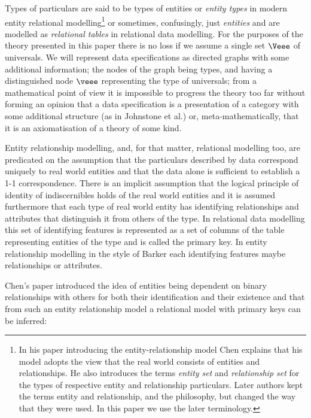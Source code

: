 Types of particulars are said to be 
types of entities or \textit{entity types} in modern entity relational modelling\footnote{In  his paper  introducing the entity-relationship model Chen explains that his model adopts the view that the real world consists of entities and relationships. He also introduces the  terms \textit{entity set} and \textit{relationship set} for the types of respective entity and relationship particulars. Later authors kept the terms entity and relationship, and the philosophy, but changed the way that they were used. In this paper we use the later terminology.} or sometimes, confusingly, just \textit{entities}  and 
are modelled as \textit{relational tables} in relational data modelling. For the purposes of the theory presented in this paper there is no loss if we assume a single set $\Veee$ of universals.  We will represent data specifications as directed graphs with 
some additional information; the nodes of the graph being types, and having a distinguished node $\veee$ representing the type of universals; from a mathematical point of view it is impossible to progress the theory too far without forming an opinion that a data specification is a presentation of a category with some additional structure 
(as in Johnstone et al.) or, meta-mathematically, that it is an axiomatisation of a theory of some kind. 


Entity relationship modelling, and, for that matter, relational modelling too, are 
predicated on the assumption that the particulars described by data 
correspond uniquely to real world entities and that the data 
alone is sufficient to establish a 1-1 correspondence. 
There is an implicit assumption that the logical principle of identity of 
indiscernibles holds of the real world entities and it is assumed furthermore 
that each type of real world entity has identifying relationships and attributes that distinguish it from  others of the type. 
In relational data modelling this set of identifying features is represented as a set of columns of the table representing entities of the type and is called the primary key.
In entity relationship modelling in the style of Barker each identifying features maybe relationships or attributes.    

Chen's paper introduced the idea of entities being dependent on binary relationships 
with others for both their identification and their existence and that from such an entity relationship model a relational model with primary keys can be inferred:

